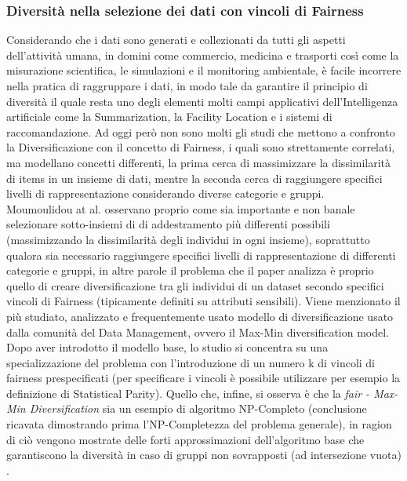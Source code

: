 \subsubsection{Diversità nella selezione dei dati con vincoli di Fairness}
Considerando che i dati sono generati e collezionati da tutti gli aspetti dell'attività umana, in domini come commercio, medicina e trasporti così come la misurazione scientifica, le simulazioni e il monitoring ambientale, è facile incorrere nella pratica di raggruppare i dati, in modo tale da garantire il principio di diversità il quale resta uno degli elementi molti campi applicativi dell'Intelligenza artificiale come la Summarization, la Facility Location e i sistemi di raccomandazione. Ad oggi però non sono molti gli studi che mettono a confronto la Diversificazione con il concetto di Fairness, i quali sono strettamente correlati, ma modellano concetti differenti, la prima cerca di massimizzare la dissimilarità di items in un insieme di dati, mentre la seconda cerca di raggiungere specifici livelli di rappresentazione considerando diverse categorie e gruppi. \\ Moumoulidou at al. \cite{FairnessDefinitionExplained} osservano proprio come sia importante e non banale selezionare sotto-insiemi di di addestramento più differenti possibili (massimizzando la dissimilarità degli individui in ogni insieme), soprattutto qualora sia necessario raggiungere specifici livelli di rappresentazione di differenti categorie e gruppi, in altre parole il problema che il paper analizza è proprio quello di creare diversificazione tra gli individui di un dataset secondo specifici vincoli di Fairness (tipicamente definiti su attributi sensibili). Viene menzionato il più studiato, analizzato e frequentemente usato modello di diversificazione usato dalla comunità del Data Management, ovvero il Max-Min diversification model. Dopo aver introdotto il modello base, lo studio si concentra su una specializzazione del problema con l'introduzione di un numero k di vincoli di fairness prespecificati (per specificare i vincoli è possibile utilizzare per esempio la definizione di Statistical Parity). Quello che, infine, si osserva è che la \emph{fair - Max-Min Diversification} sia un esempio di algoritmo NP-Completo (conclusione ricavata dimostrando prima l'NP-Completezza del problema generale), in ragion di ciò vengono mostrate delle forti approssimazioni dell'algoritmo base che garantiscono la diversità in caso di gruppi non sovrapposti (ad intersezione vuota) \cite{moumoulidou2020diverse}.

